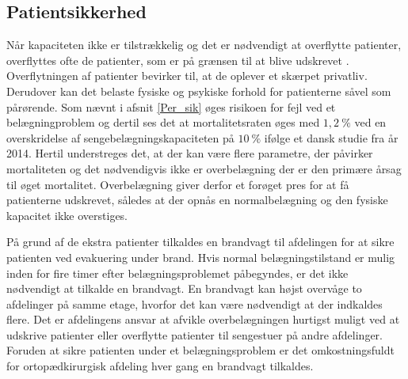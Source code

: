 \subsection{Patientsikkerhed}
Når kapaciteten ikke er tilstrækkelig og det er nødvendigt at overflytte patienter, overflyttes ofte de patienter, som er på grænsen til at blive udskrevet .
\noindent
Overflytningen af patienter bevirker til, at de oplever et skærpet privatliv. \cite{Madsen2014} Derudover kan det belaste fysiske og psykiske forhold for patienterne såvel som pårørende. \cite{Heidmann2014} Som nævnt i afsnit \ref{Per_sik} øges risikoen for fejl ved et belægningproblem og dertil ses det at mortalitetsraten øges med $1,2~\%$ ved en overskridelse af sengebelægningskapaciteten på $10~\%$ ifølge et dansk studie fra år 2014. \cite{Madsen2014} Hertil understreges det, at der kan være flere parametre, der påvirker mortaliteten og det nødvendigvis ikke er overbelægning der er den primære årsag til øget mortalitet. Overbelægning giver derfor et forøget pres for at få patienterne udskrevet, således at der opnås en normalbelægning og  den fysiske kapacitet ikke overstiges.  


På grund af de ekstra patienter tilkaldes en brandvagt til afdelingen for at sikre patienten ved evakuering under brand. Hvis normal belægningstilstand er mulig inden for fire timer efter belægningsproblemet påbegyndes, er det ikke nødvendigt at tilkalde en brandvagt. En brandvagt kan højst overvåge to afdelinger på samme etage, hvorfor det kan være nødvendigt at der indkaldes flere. Det er afdelingens ansvar at afvikle overbelægningen hurtigst muligt ved at udskrive patienter eller overflytte patienter til sengestuer på andre afdelinger. \cite{Beredskab2016} Foruden at sikre patienten under et belægningsproblem er det omkostningsfuldt for ortopædkirurgisk afdeling hver gang en brandvagt tilkaldes.  


